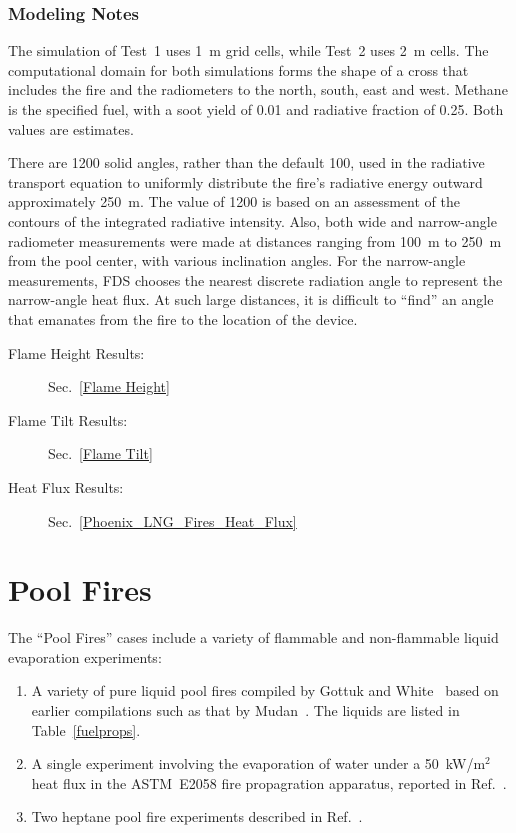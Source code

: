 \subsubsection{Modeling Notes}

The simulation of Test~1 uses 1~m grid cells, while Test~2 uses 2~m cells. The computational domain for both simulations forms the shape of a cross that includes the fire and the radiometers to the north, south, east and west. Methane is the specified fuel, with a soot yield of 0.01 and radiative fraction of 0.25. Both values are estimates. 

There are 1200 solid angles, rather than the default 100, used in the radiative transport equation to uniformly distribute the fire's radiative energy outward approximately 250~m. The value of 1200 is based on an assessment of the contours of the integrated radiative intensity. Also, both wide and narrow-angle radiometer measurements were made at distances ranging from 100~m to 250~m from the pool center, with various inclination angles. For the narrow-angle measurements, FDS chooses the nearest discrete radiation angle to represent the narrow-angle heat flux. At such large distances, it is difficult to ``find'' an angle that emanates from the fire to the location of the device.

\begin{description}
\item[Flame Height Results:] Sec.~\ref{Flame Height} 
\item[Flame Tilt Results:] Sec.~\ref{Flame Tilt} 
\item[Heat Flux Results:] Sec.~\ref{Phoenix_LNG_Fires_Heat_Flux} 
\end{description}

\FloatBarrier

\section{Pool Fires}
\label{Pool_Fires_Description}

The ``Pool Fires'' cases include a variety of flammable and non-flammable liquid evaporation experiments:
\begin{enumerate}
\item A variety of pure liquid pool fires compiled by Gottuk and White~\cite{SFPE:Gottuk_and_White} based on earlier compilations such as that by Mudan~\cite{Mudan:1984}. The liquids are listed in Table~\ref{fuelprops}.
\item A single experiment involving the evaporation of water under a 50~kW/m$^2$ heat flux in the ASTM~E2058 fire propagration apparatus, reported in Ref.~\cite{SFPE:Tewarson}. 
\item Two heptane pool fire experiments described in Ref.~\cite{Sikanen:2016}.
\end{enumerate}

